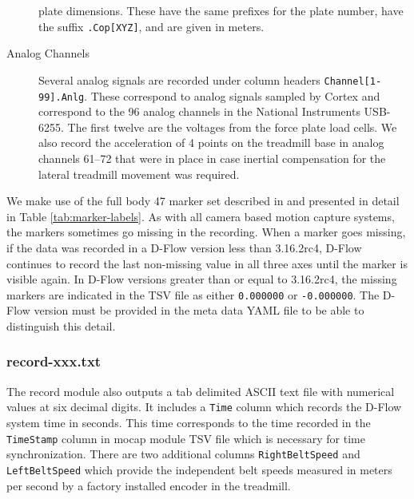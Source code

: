 \documentclass[fleqn,12pt]{wlpeerj}
\begin{document}
\begin{description}
    plate dimensions. These have the same prefixes for the plate number, have
    the suffix \verb+.Cop[XYZ]+, and are given in meters.
  \item[Analog Channels] Several analog signals are recorded under column
    headers \verb+Channel[1-99].Anlg+. These correspond to analog signals
    sampled by Cortex and correspond to the 96 analog channels in the National
    Instruments USB-6255. The first twelve are the voltages from the
    force plate load cells. We also record the acceleration of 4 points on the
    treadmill base in analog channels 61--72 that were in place in case
    inertial compensation for the lateral treadmill movement was required.
\end{description}

We make use of the full body 47 marker set described in \cite{Bogert2013} and
presented in detail in Table \ref{tab:marker-labels}. As with all camera based
motion capture systems, the markers sometimes go missing in the recording. When
a marker goes missing, if the data was recorded in a D-Flow version less than
3.16.2rc4, D-Flow continues to record the last non-missing value in all
three axes until the marker is visible again. In D-Flow versions greater than
or equal to 3.16.2rc4, the missing markers are indicated in the TSV file as
either \verb|0.000000| or \verb|-0.000000|. The D-Flow version must be provided
in the meta data YAML file to be able to distinguish this detail.

\subsubsection*{record-xxx.txt}
%
The record module also outputs a tab delimited ASCII text file with numerical
values at six decimal digits. It includes a \verb+Time+ column which records
the D-Flow system time in seconds. This time corresponds to the time recorded
in the \verb+TimeStamp+ column in mocap module TSV file which is necessary for
time synchronization. There are two additional columns \verb+RightBeltSpeed+
and \verb+LeftBeltSpeed+ which provide the independent belt speeds measured in
meters per second by a factory installed encoder in the treadmill.
\end{document}
